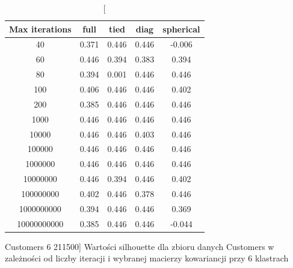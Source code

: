 \documentclass{classrep}
\begin{document}
{{\begin{table}[!htbp]
                \begin{minipage}{1\textwidth}
                \centering
                \begin{tabular}{|c|c|c|c|c|}
                \hline
                Max iterations & full & tied & diag & spherical \\ \hline
                40 & 0.371 & 0.446 & 0.446 & -0.006 \\ \hline
                60 & 0.446 & 0.394 & 0.383 & 0.394 \\ \hline
                80 & 0.394 & 0.001 & 0.446 & 0.446 \\ \hline
                100 & 0.406 & 0.446 & 0.446 & 0.402 \\ \hline
                200 & 0.385 & 0.446 & 0.446 & 0.446 \\ \hline
                1000 & 0.446 & 0.446 & 0.446 & 0.446 \\ \hline
                10000 & 0.446 & 0.446 & 0.403 & 0.446 \\ \hline
                100000 & 0.446 & 0.446 & 0.446 & 0.446 \\ \hline
                1000000 & 0.446 & 0.446 & 0.446 & 0.446 \\ \hline
                10000000 & 0.446 & 0.394 & 0.446 & 0.402 \\ \hline
                100000000 & 0.402 & 0.446 & 0.378 & 0.446 \\ \hline
                1000000000 & 0.394 & 0.446 & 0.446 & 0.369 \\ \hline
                10000000000 & 0.385 & 0.446 & 0.446 & -0.044 \\ \hline
                \end{tabular}
                \caption
                [Customers 6 211500]
                {Wartości silhouette dla zbioru danych Customers w zależności od liczby
                iteracji i wybranej macierzy kowariancji przy 6 klastrach}
                \label{Customers_6_211500}
                \end{minipage}
                \hfill


\end{table}}}
\end{document}
